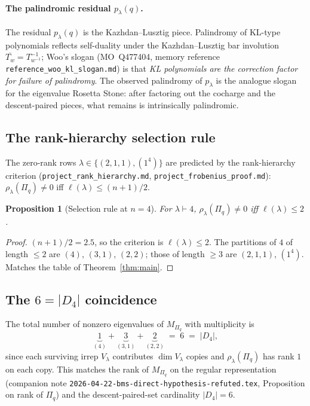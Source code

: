 \documentclass[11pt]{article}
\newtheorem{proposition}[theorem]{Proposition}
\theoremstyle{definition}
\begin{document}
\paragraph{The palindromic residual $p_\lambda(q)$.}
The residual $p_\lambda(q)$ is the Kazhdan--Lusztig piece. Palindromy of
KL-type polynomials reflects self-duality under the Kazhdan--Lusztig bar
involution $\overline{T_w} = T_{w^{-1}}^{-1}$; Woo's slogan (MO~Q477404,
memory reference \texttt{reference\_woo\_kl\_slogan.md}) is that
\emph{KL polynomials are the correction factor for failure of palindromy}.
The observed palindromy of $p_\lambda$ is the analogue slogan for the
eigenvalue Rosetta Stone: after factoring out the cocharge and the
descent-paired pieces, what remains is intrinsically palindromic.

\subsection{The rank-hierarchy selection rule}

The zero-rank rows $\lambda \in \{(2,1,1), (1^4)\}$ are predicted by the
rank-hierarchy criterion
(\texttt{project\_rank\_hierarchy.md}, \texttt{project\_frobenius\_proof.md}):
$\rho_\lambda(\Pi_q) \ne 0$ iff $\ell(\lambda) \leq (n+1)/2$.

\begin{proposition}[Selection rule at $n=4$]
For $\lambda \vdash 4$, $\rho_\lambda(\Pi_q) \ne 0$ iff $\ell(\lambda) \leq 2$.
\end{proposition}

\begin{proof}
$(n+1)/2 = 2.5$, so the criterion is $\ell(\lambda) \leq 2$. The partitions
of $4$ of length $\leq 2$ are $(4)$, $(3,1)$, $(2,2)$; those of length
$\geq 3$ are $(2,1,1)$, $(1^4)$. Matches the table of Theorem~\ref{thm:main}.
\end{proof}

\subsection{The $6 = |D_4|$ coincidence}\label{sec:six}

The total number of nonzero eigenvalues of $M_{\Pi_q}$ with multiplicity is
\[
\underbrace{1}_{(4)} + \underbrace{3}_{(3,1)} + \underbrace{2}_{(2,2)}
\;=\; 6 \;=\; |D_4|,
\]
since each surviving irrep $V_\lambda$ contributes $\dim V_\lambda$ copies
and $\rho_\lambda(\Pi_q)$ has rank $1$ on each copy. This matches the
rank of $M_{\Pi_q}$ on the regular representation (companion note
\texttt{2026-04-22-bms-direct-hypothesis-refuted.tex},
Proposition on rank of $\Pi_q$) and the descent-paired-set cardinality
$|D_4|=6$.
\end{document}
